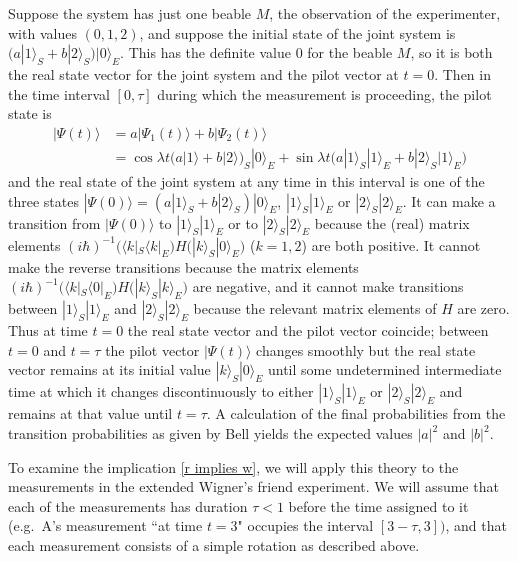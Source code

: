\documentclass[12pt,reqno]{article}
\renewcommand{\(}{\left(}
\renewcommand{\)}{\right)}
\renewcommand{\.}{\centerdot}
\newcommand{\1}{\mathbf{1}}
\newcommand{\<}{\langle}
\renewcommand{\>}{\rangle}
\theoremstyle{definition}
\theoremstyle{remark}
\numberwithin{equation}{section}
\begin{document}
Suppose the system has just one beable $M$, the observation of the experimenter, with values $(0,1,2)$, and suppose the initial state of the joint system is $\big(a|1\>_S + b|2\>_S\big)|0\>_E$. This has the definite value 0 for the beable $M$, so it is both the real state vector for the joint system and the pilot vector at $t = 0$. Then in the time interval $[0,\tau]$ during which the measurement is proceeding, the pilot state is 
\begin{align*}
|\Psi(t)\> &= a|\Psi_1(t)\> + b|\Psi_2(t)\>\\
&= \cos\lambda t\big(a|1\>+ b|2\>\big)_S|0\>_E + \sin\lambda t\big(a|1\>_S|1\>_E + b|2\>_S|1\>_E\big)
\end{align*}
and the real state of the joint system at any time in this interval is one of the three states $|\Psi(0)\> = (a|1\>_S + b|2\>_S)|0\>_E$, $|1\>_S|1\>_E$ or $|2\>_S|2\>_E$. It can make a transition from $|\Psi(0)\>$ to $|1\>_S|1\>_E$ or to $|2\>_S|2\>_E$ because the (real) matrix elements $(i\hbar)^{-1}\big(\<k|_S\<k|_E\big) H \big(|k\>_S|0\>_E\big)$ ($k = 1,2$) are both positive. It cannot make the reverse transitions because the  
matrix elements $(i\hbar)^{-1}\big(\<k|_S\<0|_E\big) H \big(|k\>_S|k\>_E\big)$ are negative, and it cannot make transitions between $|1\>_S|1\>_E$ and $|2\>_S|2\>_E$ because the relevant matrix elements of $H$ are zero. Thus at time $t = 0$ the real state vector and the pilot vector coincide; between $t = 0$ and $t = \tau$ the pilot vector $|\Psi(t)\>$ changes smoothly but the real state vector remains at its initial value $|k\>_S|0\>_E$ until some undetermined intermediate time at which it changes discontinuously to either $|1\>_S|1\>_E$ or $|2\>_S|2\>_E$ and remains at that value until $t = \tau$. A calculation of the final probabilities from the transition probabilities as given by Bell yields the expected values $|a|^2$ and $|b|^2$.  


To examine the implication \eqref{r implies w}, we will apply this theory to the measurements in the extended Wigner's friend experiment. We will assume that each of the measurements has duration $\tau < 1$ before the time assigned to it (e.g.\ A's measurement ``at time $t = 3$" occupies the interval $[3 - \tau, 3])$, and that each measurement consists of a simple rotation as described above.
\end{document}
